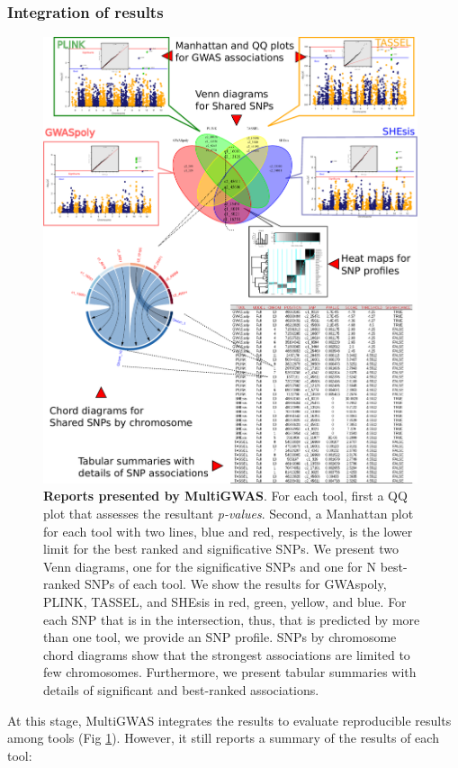 \documentclass{article}
\begin{document}
\subsubsection{Integration of results}
\begin{figure}
\includegraphics[width=11cm]{images/report-methodologies-all-plots} \caption{\textbf{Reports presented by MultiGWAS}. For each tool, first a QQ plot that assesses the resultant \emph{p-values}. Second, a Manhattan plot for each tool with two lines, blue and red, respectively, is the lower limit for the best ranked and significative SNPs. We present two Venn diagrams, one for the significative SNPs and one for N best-ranked SNPs of each tool. We show the results for GWAspoly, PLINK, TASSEL, and SHEsis in red, green, yellow, and blue. For each SNP that is in the intersection, thus, that is predicted by more than one tool, we provide an SNP profile. SNPs by chromosome chord diagrams show that the strongest associations are limited to few chromosomes. Furthermore, we present tabular summaries with details of significant and best-ranked associations.\label{fig:Reports} }
\end{figure}
At this stage, MultiGWAS integrates the results to evaluate reproducible results among tools (Fig \ref{fig:Reports}). However, it still reports a summary of the results of each tool: 
\end{document}
